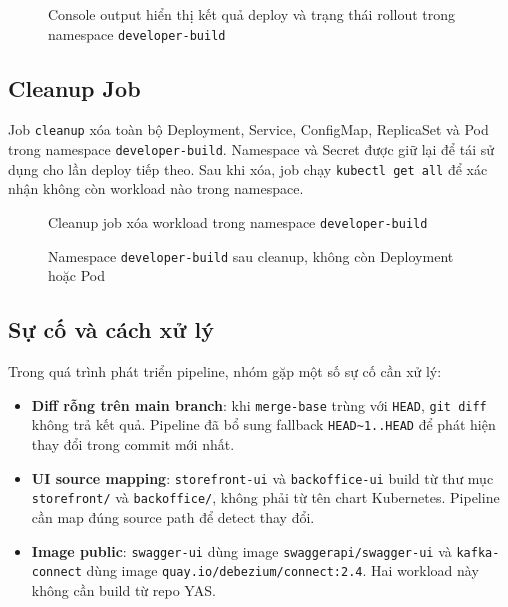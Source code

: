 \begin{figure}[H]
\centering
{}
\caption[Kết quả deploy và rollout trong namespace developer-build]{Console output hiển thị kết quả deploy và trạng thái rollout trong namespace \texttt{developer-build}}
\end{figure}

\subsection{Cleanup Job}

Job \texttt{cleanup} xóa toàn bộ Deployment, Service, ConfigMap, ReplicaSet và Pod trong namespace \texttt{developer-build}. Namespace và Secret được giữ lại để tái sử dụng cho lần deploy tiếp theo. Sau khi xóa, job chạy \texttt{kubectl get all} để xác nhận không còn workload nào trong namespace.

\begin{figure}[H]
\centering
{}
\caption{Cleanup job xóa workload trong namespace \texttt{developer-build}}
\end{figure}

\begin{figure}[H]
\centering
{}
\caption{Namespace \texttt{developer-build} sau cleanup, không còn Deployment hoặc Pod}
\end{figure}

\subsection{Sự cố và cách xử lý}

Trong quá trình phát triển pipeline, nhóm gặp một số sự cố cần xử lý:

\begin{itemize}
\item \textbf{Diff rỗng trên main branch}: khi \texttt{merge-base} trùng với \texttt{HEAD}, \texttt{git diff} không trả kết quả. Pipeline đã bổ sung fallback \texttt{HEAD\textasciitilde1..HEAD} để phát hiện thay đổi trong commit mới nhất.
\item \textbf{UI source mapping}: \texttt{storefront-ui} và \texttt{backoffice-ui} build từ thư mục \texttt{storefront/} và \texttt{backoffice/}, không phải từ tên chart Kubernetes. Pipeline cần map đúng source path để detect thay đổi.
\item \textbf{Image public}: \texttt{swagger-ui} dùng image \texttt{swaggerapi/swagger-ui} và \texttt{kafka-connect} dùng image \texttt{quay.io/debezium/connect:2.4}. Hai workload này không cần build từ repo YAS.
\end{itemize}

